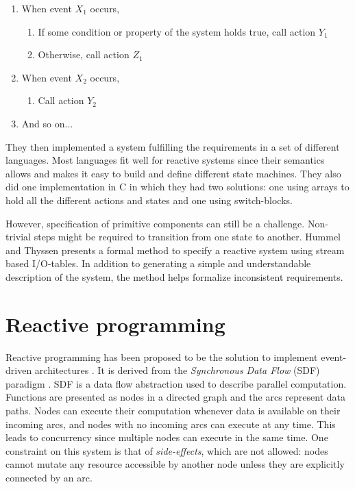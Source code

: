 \begin{enumerate}
\item
  When event $X_1$ occurs,
\begin{enumerate}
\item
  If some condition or property of the system holds true, call action $Y_1$
\item
  Otherwise, call action $Z_1$
\end{enumerate}

\item
  When event $X_2$ occurs,
\begin{enumerate}
\item
  Call action $Y_2$
\end{enumerate}

\item
  And so on...
\end{enumerate}

They then implemented a system fulfilling the requirements in a set of
different languages. Most languages fit well for reactive systems since their
semantics allows and makes it easy to build and define different state
machines.  They also did one implementation in C in which they had two
solutions: one using arrays to hold all the different actions and states and
one using switch-blocks.

However, specification of primitive components can still be a challenge.
Non-trivial steps might be required to transition from one state to another.
Hummel and Thyssen \cite{hummel2009behavioral} presents a formal method to
specify a reactive system using stream based I/O-tables. In addition to
generating a simple and understandable description of the system, the method
helps formalize inconsistent requirements.

\section{Reactive programming}

Reactive programming has been proposed to be the solution to implement
event-driven architectures \cite{bainomugisha2013survey}. It is derived from
the \textit{Synchronous Data Flow} (SDF) paradigm \cite{lee1987synchronous}.
SDF is a data flow abstraction used to describe parallel computation.
Functions are presented as nodes in a directed graph and the arcs represent
data paths. Nodes can execute their computation whenever data is available on
their incoming arcs, and nodes with no incoming arcs can execute at any time.
This leads to concurrency since multiple nodes can execute in the same time.
One constraint on this system is that of \textit{side-effects}, which are not
allowed: nodes cannot mutate any resource accessible by another node unless
they are explicitly connected by an arc.

